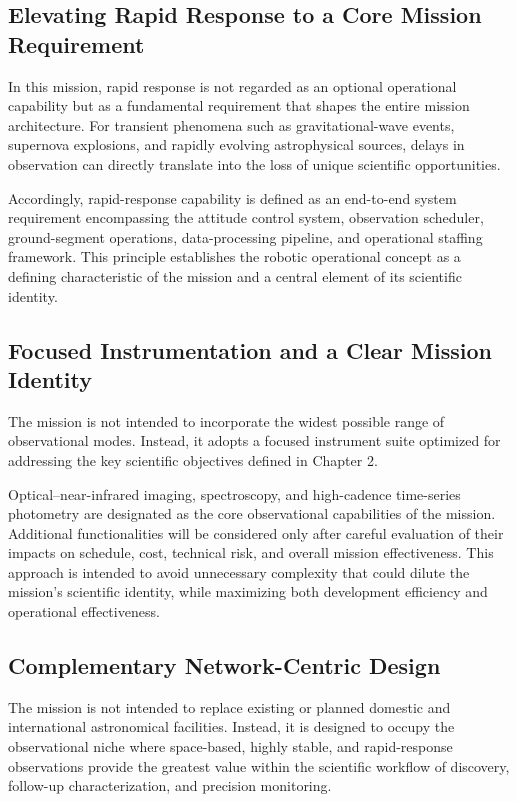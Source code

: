 \subsection{Elevating Rapid Response to a Core Mission Requirement}

In this mission, rapid response is not regarded as an optional operational capability but as a fundamental requirement that shapes the entire mission architecture. For transient phenomena such as gravitational-wave events, supernova explosions, and rapidly evolving astrophysical sources, delays in observation can directly translate into the loss of unique scientific opportunities.

Accordingly, rapid-response capability is defined as an end-to-end system requirement encompassing the attitude control system, observation scheduler, ground-segment operations, data-processing pipeline, and operational staffing framework. This principle establishes the robotic operational concept as a defining characteristic of the mission and a central element of its scientific identity.

\subsection{Focused Instrumentation and a Clear Mission Identity}

The mission is not intended to incorporate the widest possible range of observational modes. Instead, it adopts a focused instrument suite optimized for addressing the key scientific objectives defined in Chapter 2.

Optical--near-infrared imaging, spectroscopy, and high-cadence time-series photometry are designated as the core observational capabilities of the mission. Additional functionalities will be considered only after careful evaluation of their impacts on schedule, cost, technical risk, and overall mission effectiveness. This approach is intended to avoid unnecessary complexity that could dilute the mission's scientific identity, while maximizing both development efficiency and operational effectiveness.

\subsection{Complementary Network-Centric Design}

The mission is not intended to replace existing or planned domestic and international astronomical facilities. Instead, it is designed to occupy the observational niche where space-based, highly stable, and rapid-response observations provide the greatest value within the scientific workflow of discovery, follow-up characterization, and precision monitoring.

